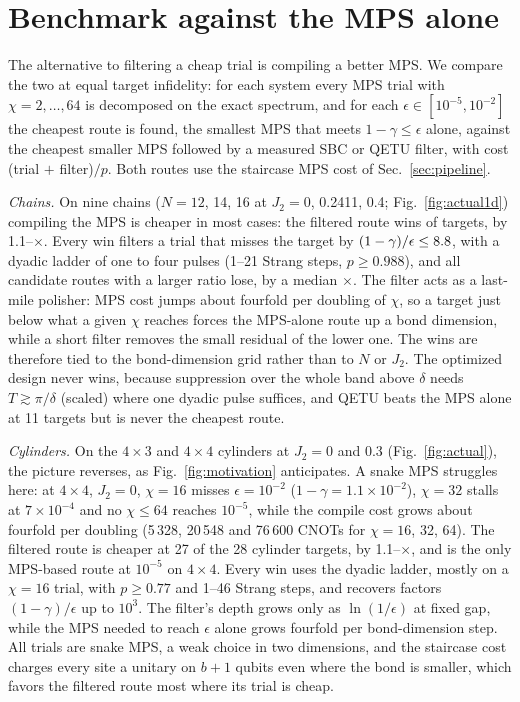 \documentclass[aps,pra,twocolumn,superscriptaddress,nofootinbib]{revtex4-2}
\begin{document}
\section{Benchmark against the MPS alone}
\label{sec:crossover}

The alternative to filtering a cheap trial is compiling a better MPS. We compare the two at equal target infidelity:
for each system every MPS trial with $\chi=2,\dots,64$ is decomposed on the exact spectrum, and for each
$\epsilon\in[10^{-5},10^{-2}]$ the cheapest route is found, the smallest MPS that meets $1-\gamma\le\epsilon$ alone,
against the cheapest smaller MPS followed by a measured SBC or QETU filter, with cost (trial $+$ filter)$/p$. Both
routes use the staircase MPS cost of Sec.~\ref{sec:pipeline}.

\emph{Chains.} On nine chains ($N=12$, 14, 16 at $J_2=0$, 0.2411, 0.4; Fig.~\ref{fig:actual1d}) compiling the MPS is
cheaper in most cases: the filtered route wins \actOneWins{} of \actOneTot{} targets, by 1.1--\actOneRatioMax$\times$.
Every win filters a trial that misses the target by $(1-\gamma)/\epsilon\le8.8$, with a dyadic ladder of
one to four pulses (1--21 Strang steps, $p\ge0.988$), and all \actOneFar{} candidate routes with a larger ratio lose,
by a median \actOneFarMed$\times$. The filter acts as a last-mile polisher: MPS cost jumps about fourfold per doubling
of $\chi$, so a target just below what a given $\chi$ reaches forces the MPS-alone route up a bond dimension, while a
short filter removes the small residual of the lower one. The wins are therefore tied to the bond-dimension grid
rather than to $N$ or $J_2$. The optimized design never wins, because suppression over the whole band above $\delta$
needs $T\gtrsim\pi/\delta$ (scaled) where one dyadic pulse suffices, and QETU beats the MPS alone at 11 targets but is never the
cheapest route.

\emph{Cylinders.} On the $4\times3$ and $4\times4$ cylinders at $J_2=0$ and 0.3 (Fig.~\ref{fig:actual}), the picture
reverses, as Fig.~\ref{fig:motivation} anticipates. A snake MPS struggles here: at
$4\times4$, $J_2=0$, $\chi=16$ misses $\epsilon=10^{-2}$ ($1-\gamma=1.1\times10^{-2}$), $\chi=32$ stalls at
$7\times10^{-4}$ and no $\chi\le64$ reaches $10^{-5}$, while the compile cost grows about fourfold per doubling (5\,328,
20\,548 and 76\,600 CNOTs for $\chi=16$, 32, 64). The filtered route is cheaper at 27 of the 28 cylinder targets, by
1.1--\actRatioMax$\times$, and is the only MPS-based route at $10^{-5}$ on $4\times4$. Every win uses the dyadic ladder,
mostly on a $\chi=16$ trial, with $p\ge0.77$ and 1--46 Strang steps, and recovers factors $(1-\gamma)/\epsilon$ up to
$10^3$. The filter's depth grows only as $\ln(1/\epsilon)$ at fixed gap, while the MPS needed to reach $\epsilon$ alone
grows fourfold per bond-dimension step. All trials are snake MPS, a weak choice in two dimensions, and the staircase
cost charges every site a unitary on $b+1$ qubits even where the bond is smaller, which favors the filtered route most
where its trial is cheap.
\end{document}
